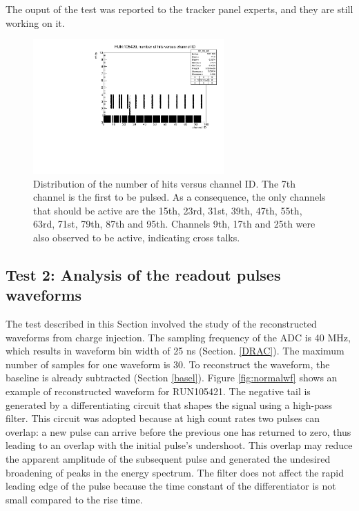 The ouput of the test was reported to the tracker panel 
experts, and they are still working on it.
\begin{figure}[!h]
  \centering
  \includegraphics[width=0.65\textwidth]{figures/pdf/run105420_nh_vs_ch.pdf}
  \caption{Distribution of the number of hits versus channel ID. The 7th channel is the first to be pulsed. 
  As a consequence, the only channels that should be active are the 15th, 23rd, 31st, 39th, 47th, 55th, 63rd, 71st, 79th, 87th and 95th. 
  Channels 9th, 17th and 25th were also observed to be active, indicating cross talks.}
 \label{fig:cross}
\end{figure}
\subsection{Test 2: Analysis of the readout pulses waveforms}\label{wf}
The test described in this Section involved the study 
of the reconstructed waveforms from charge injection. 
The sampling frequency of the ADC is 40 MHz, which results 
in waveform bin width of 25 ns (Section. \ref{DRAC}). 
The maximum number of samples for one waveform is 30. 
To reconstruct the waveform, the baseline is already subtracted (Section \ref{basel}). 
Figure \ref{fig:normalwf} shows an example of reconstructed waveform for RUN105421. 
The negative tail is generated by a 
differentiating circuit that shapes the signal 
using a high-pass filter. This circuit was adopted 
because at high count rates two pulses can overlap: a 
new pulse can arrive before the previous one 
has returned to zero, thus leading to an overlap 
with the initial pulse's undershoot. This overlap 
may reduce the apparent amplitude of the subsequent 
pulse and generated the undesired broadening of peaks 
in the energy spectrum. 
The filter does not affect the rapid leading edge 
of the pulse because the time constant of the differentiator 
is not small compared to the rise time.

